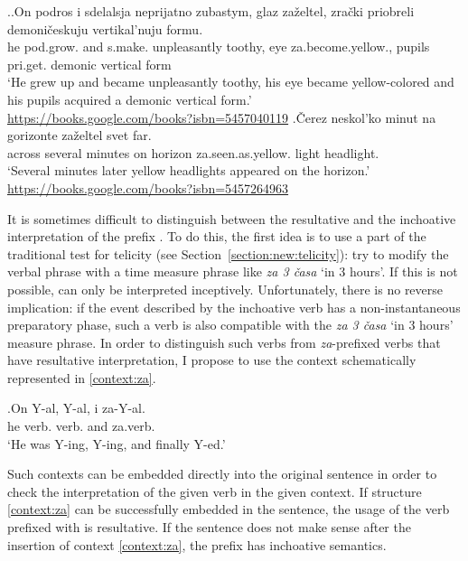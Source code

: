 \ex.\label{ex:zazeltet}\ag.\label{ex:zazeltet1}On podros i sdelalsja neprijatno zubastym, glaz za\v{z}eltel, zra\v{c}ki priobreli demoni\v{c}eskuju vertikal'nuju formu.\\
he pod.grow. and s.make. unpleasantly toothy, eye za.become.yellow., pupils pri.get. demonic vertical form\\
`He grew up and became unpleasantly toothy, his eye became yellow-colored and his pupils acquired a demonic vertical form.'\\\hbox{}\hfill\hbox{\url{https://books.google.com/books?isbn=5457040119}}
\bg.\label{ex:zazeltet2}\v{C}erez neskol'ko minut na gorizonte za\v{z}eltel svet far.\\
across several minutes on horizon za.seen.as.yellow. light headlight.\\
`Several minutes later yellow headlights appeared on the horizon.'\\\hbox{}\hfill\hbox{\url{https://books.google.com/books?isbn=5457264963}}

It is sometimes difficult to distinguish between the resultative and the inchoative interpretation of the prefix . To do this, the first idea is to use a part of the traditional test for telicity (see Section~\ref{section:new:telicity}): try to modify the verbal phrase with a time measure phrase like \textit{za 3 \v{c}asa} `in 3 hours'. If this is not possible, can only be interpreted inceptively. Unfortunately, there is no reverse implication: if the event described by the inchoative verb has a non-instantaneous preparatory phase, such a verb is also compatible with the \textit{za 3 \v{c}asa} `in 3 hours' measure phrase. In order to distinguish such verbs from \textit{za}-prefixed verbs that have resultative interpretation, I propose to use the context schematically represented in \ref{context:za}.

\exg.\label{context:za}On Y-al, Y-al, i za-Y-al.\\
he verb. verb. and za.verb.\\
\trans `He was Y-ing, Y-ing, and finally Y-ed.'

Such contexts can be embedded directly into the original sentence in order to check the interpretation of the given verb in the given context. If structure \ref{context:za} can be successfully embedded in the sentence, the usage of the verb prefixed with  is resultative. If the sentence does not make sense after the insertion of context \ref{context:za}, the prefix  has inchoative semantics.

